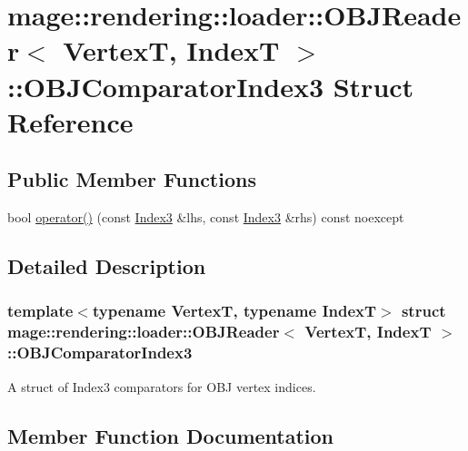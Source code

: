 \hypertarget{structmage_1_1rendering_1_1loader_1_1_o_b_j_reader_1_1_o_b_j_comparator_index3}{}\section{mage\+:\+:rendering\+:\+:loader\+:\+:O\+B\+J\+Reader$<$ VertexT, IndexT $>$\+:\+:O\+B\+J\+Comparator\+Index3 Struct Reference}
\label{structmage_1_1rendering_1_1loader_1_1_o_b_j_reader_1_1_o_b_j_comparator_index3}
\subsection*{Public Member Functions}
\begin{DoxyCompactItemize}
\item 
bool \hyperlink{structmage_1_1rendering_1_1loader_1_1_o_b_j_reader_1_1_o_b_j_comparator_index3_a659ade7771b329b00a8ec1f1fbd6078c}{operator()} (const \hyperlink{classmage_1_1rendering_1_1loader_1_1_o_b_j_reader_af9e3ab714bb4c9ab74fe2460a8c8067b}{Index3} \&lhs, const \hyperlink{classmage_1_1rendering_1_1loader_1_1_o_b_j_reader_af9e3ab714bb4c9ab74fe2460a8c8067b}{Index3} \&rhs) const noexcept
\end{DoxyCompactItemize}


\subsection{Detailed Description}
\subsubsection*{template$<$typename VertexT, typename IndexT$>$\newline
struct mage\+::rendering\+::loader\+::\+O\+B\+J\+Reader$<$ Vertex\+T, Index\+T $>$\+::\+O\+B\+J\+Comparator\+Index3}

A struct of {\ttfamily Index3} comparators for O\+BJ vertex indices. 

\subsection{Member Function Documentation}
\hypertarget{structmage_1_1rendering_1_1loader_1_1_o_b_j_reader_1_1_o_b_j_comparator_index3_a659ade7771b329b00a8ec1f1fbd6078c}{}\label{structmage_1_1rendering_1_1loader_1_1_o_b_j_reader_1_1_o_b_j_comparator_index3_a659ade7771b329b00a8ec1f1fbd6078c} 
